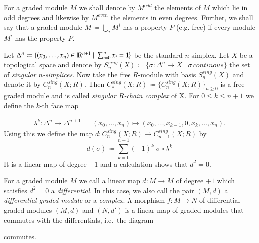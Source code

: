 For a graded module $M$ we shall denote by $M^{odd}$ the elements of $M$ which lie in odd degrees and likewise by 
$M^{even}$ the elements in even degrees.
Further, we shall say that a graded module $M \coloneqq \bigcup_i M^i$ has a property $P$ (e.g. free) if every module $M^i$ has the property $P$.
 
\begin{Example}
\label{ex:SingularChainComplex}
 Let $\Delta^n \coloneqq {\lbrace (x_0, \dotsc , x_n) \in \mathbb{R}^{n+1} \; | \; \sum_{i = 0}^n x_i = 1\rbrace}$ be the standard
 $n$-simplex. Let $X$ be a topological space and denote by
 $S_n^{sing}(X) \coloneqq {\lbrace \sigma \colon \Delta^n \to X \; | \; \sigma \, continous \rbrace}$ the set of
 \emph{singular $n$-simplices}. 
 Now take the free $R$-module with basis $S_n^{sing}(X)$ 
 and denote it by $C_n^{sing}(X;R)$.
 Then $ C_*^{sing}(X;R) \coloneqq {\lbrace C_n^{sing}(X;R)\rbrace}_{n \geq 0}$ is a free graded module and is called 
 \emph{singular $R$-chain complex} of X. \newline
 For $0 \leq k \leq n+1$ we define the $k$-th face map
 
 \begin{align*}
 \lambda^k \colon \Delta^{n} \to \Delta^{n+1}&  &
 (x_0, \dotsc, x_n) \mapsto (x_0, \dotsc, x_{k-1},0, x_k, \dotsc, x_n).
 \end{align*}
 Using this we define the map $d \colon C_n^{sing}(X;R) \to C_{n-1}^{sing}(X;R)$ by
 $$ d(\sigma) \coloneqq \sum_{k = 0}^{n+1} (-1)^k \; \sigma \circ \lambda^k$$
 It is a linear map of degree $-1$ and a calculation shows that $d^2 = 0$.
 \end{Example}

\begin{Definition}

For a graded module $M$ we call a linear map $d \colon M \to M$ of degree $+1$ which satisfies $ d^2 = 0$ a \emph{differential}.
In this case, we also call the pair $(M , d)$ a \emph{differential graded module} or a \emph{complex}.
A morphism $f \colon M \to N$ of differential graded modules $(M,d)$ and $(N,d')$ is a linear map of graded modules that commutes with the 
differentials, i.e.\ the diagram \\

\centerline{
}
commutes.
\end{Definition}

